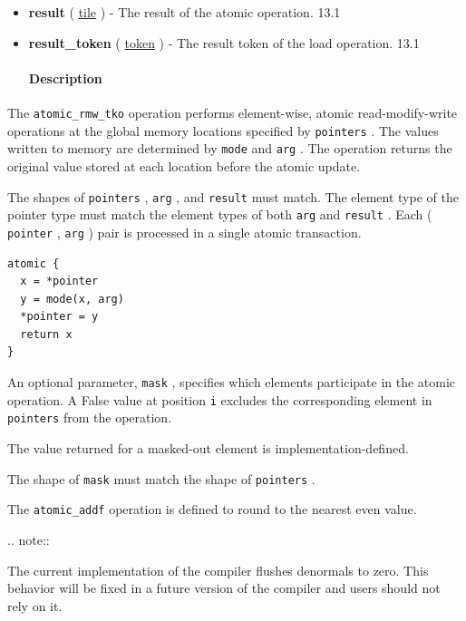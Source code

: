 \documentclass{article}
\begin{document}
\begin{itemize}
\paragraph{Results}

\item \textbf{result} ( \href{https://docs.nvidia.com/cuda/tile-ir/latest/sections/types.html#type-tile}{tile} ) - The result of the atomic operation. 13.1
\item \textbf{result\_token} ( \href{https://docs.nvidia.com/cuda/tile-ir/latest/sections/operations.html#type-token}{token} ) - The result token of the load operation. 13.1


\paragraph{Description}

\end{itemize}
The \texttt{atomic\_rmw\_tko} operation performs element-wise, atomic read-modify-write operations at the global memory locations specified by \texttt{pointers} . The values written to memory are determined by \texttt{mode} and \texttt{arg} . The operation returns the original value stored at each location before the atomic update.


The shapes of \texttt{pointers} , \texttt{arg} , and \texttt{result} must match. The element type of the pointer type must match the element types of both \texttt{arg} and \texttt{result} . Each ( \texttt{pointer} , \texttt{arg} ) pair is processed in a single atomic transaction.


\begin{lstlisting}
atomic {
  x = *pointer
  y = mode(x, arg)
  *pointer = y
  return x
}
\end{lstlisting}

An optional parameter, \texttt{mask} , specifies which elements participate in the atomic operation. A False value at position \texttt{i} excludes the corresponding element in \texttt{pointers} from the operation.

The value returned for a masked-out element is implementation-defined.

The shape of \texttt{mask} must match the shape of \texttt{pointers} .


The \texttt{atomic\_addf} operation is defined to round to the nearest even value.

.. note::

The current implementation of the compiler flushes denormals to zero. This behavior will be fixed in a future version of the compiler and users should not rely on it.
\end{document}
